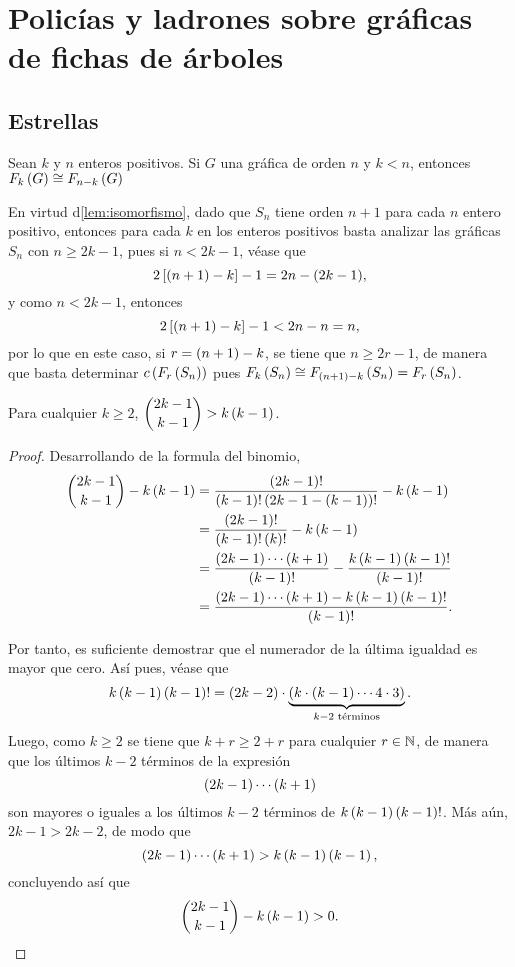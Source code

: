 \chapter{Polic\'ias y ladrones sobre gr\'aficas de fichas de \'arboles}
\label{cap:resultados}

\section{Estrellas}

\begin{lema}
\label{lem:isomorfismo}
    Sean $k$ y $n$ enteros positivos. Si $G$ una gr\'afica de orden $n$ y $k <
    n$, entonces $F_{k}\left( G\right) \cong F_{n-k}\left( G\right)$
\end{lema}

En virtud d\cref{lem:isomorfismo}, dado que $S_n$ tiene orden $n+1$ para cada
$n$ entero positivo, entonces para cada $k$ en los enteros positivos basta
analizar las gr\'aficas $S_n$ con $n\geq 2k-1$, pues si $n<2k-1$, v\'ease que
\[
    2\left[ \left( n+1\right)-k\right]-1 = 2n - (2k-1),
\]
y como $n<2k-1$, entonces
\[
    2\left[ \left( n+1\right)-k\right]-1 < 2n - n = n,
\]
por lo que en este caso, si $r=\left( n+1\right)-k$, se tiene que $n\geq 2r-1$, de
manera que basta determinar $c\left( F_{r}\left( S_n\right)\right)$ pues
$F_{k}\left( S_n\right)\cong F_{\left( n+1\right)-k}\left( S_n\right) = F_{r}\left( S_n\right)$.

\begin{lema}
\label{lem:desigualdad}
    Para cualquier $k\geq 2$, $\displaystyle\binom{2k-1}{k-1} > k\left( k-1\right)$.
\end{lema}

\begin{proof}
    Desarrollando de la formula del binomio,
    \begin{align*}
           \binom{2k-1}{k-1} - k\left( k-1\right)
        &= \frac{\left( 2k-1\right)!}{\left( k-1\right)!\left( 2k-1-\left( k-1\right)\right)!} -
           k\left( k-1\right) \\
        &= \frac{\left( 2k-1\right)!}{\left( k-1\right)!\left( k\right)!} - k\left( k-1\right) \\
        &= \frac{\left( 2k-1\right)\cdots \left( k+1\right)}{\left( k-1\right)!} - \frac{k
           \left( k-1\right)\left( k-1\right)!}{\left( k-1\right)!} \\
        &= \frac{\left( 2k-1\right)\cdots \left( k+1\right) - k\left( k-1\right)
           \left( k-1\right)!}{\left( k-1\right)!}.
    \end{align*}

    Por tanto, es suficiente demostrar que el numerador de la \'ultima igualdad
    es mayor que cero. As\'i pues, v\'ease que
    \[
        k\left( k-1\right)\left( k-1\right)! = \left( 2k-2\right)\cdot \underbrace{\left( k \cdot
        \left( k-1\right)\cdots 4 \cdot 3\right)}_{k-2 \text{ t\'erminos}}.
    \]
    Luego, como $k\geq 2$ se tiene que $k+r \geq 2+r$ para cualquier $r\in\mathbb{N}$,
    de manera que los \'ultimos $k-2$ t\'erminos de la expresi\'on 
    \[
        \left( 2k-1\right)\cdots \left( k+1\right)
    \]
    son mayores o iguales a los \'ultimos $k-2$ t\'erminos de
    $k\left( k-1\right)\left( k-1\right)!$. M\'as a\'un, $2k-1 > 2k-2$, de modo que
    \[
        \left( 2k-1\right)\cdots \left( k+1\right) > k\left( k-1\right)\left( k-1\right),
    \]
    concluyendo as\'i que
    \[
        \binom{2k-1}{k-1} - k\left( k-1\right) > 0.
    \]
\end{proof}


